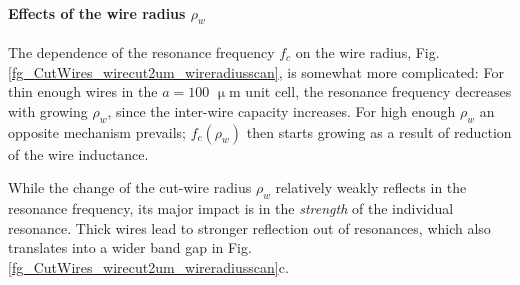 \paragraph{Effects of the wire radius $\rho_w$}%
The dependence of the resonance frequency $f_c$ on the wire radius, Fig. \ref{fg_CutWires_wirecut2um_wireradiusscan}, is somewhat more complicated: For thin enough wires in the $a=100$ $\upmu$m unit cell, the resonance frequency decreases with growing $\rho_w$, since the inter-wire capacity increases. 
For high enough $\rho_w$ an opposite mechanism prevails; $f_c(\rho_w)$ then starts growing as a result of reduction of the wire inductance.

While the change of the cut-wire radius $\rho_w$ relatively weakly reflects in the resonance frequency, its major impact is in the \textit{strength} of the individual resonance. Thick wires lead to stronger reflection out of resonances, which also translates into a wider band gap in Fig. \ref{fg_CutWires_wirecut2um_wireradiusscan}c.



